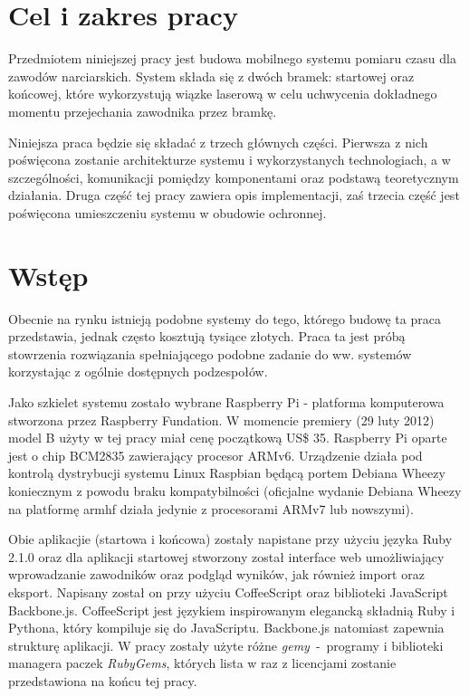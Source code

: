 \documentclass[11pt,a4paper, twoside]{article}
\begin{document}
 

\tableofcontents

\newpage
\cleardoublepage
\section{Cel i zakres pracy}
Przedmiotem niniejszej pracy jest budowa mobilnego systemu pomiaru czasu dla zawodów narciarskich. System składa się z dwóch bramek: startowej oraz końcowej, które wykorzystują wiązke laserową w celu uchwycenia dokładnego momentu przejechania zawodnika przez bramkę. 

Niniejsza praca będzie się składać z trzech głównych części. Pierwsza z nich poświęcona zostanie architekturze systemu i wykorzystanych technologiach, a w szczególności, komunikacji pomiędzy komponentami oraz podstawą teoretycznym działania. Druga część tej pracy zawiera opis implementacji, zaś trzecia część jest poświęcona umieszczeniu systemu w obudowie ochronnej.
\section{Wstęp}
Obecnie na rynku istnieją podobne systemy do tego, którego budowę ta praca przedstawia, jednak często kosztują tysiące złotych. Praca ta jest próbą stowrzenia rozwiązania spełniającego podobne zadanie do ww. systemów korzystając z ogólnie dostępnych podzespołów.

Jako szkielet systemu zostało wybrane Raspberry Pi - platforma komputerowa stworzona przez Raspberry Fundation. W momencie premiery (29 luty 2012) model B użyty w tej pracy miał cenę początkową US\$ 35. Raspberry Pi oparte jest o chip BCM2835 zawierający procesor ARMv6. Urządzenie działa pod kontrolą dystrybucji systemu Linux Raspbian będącą portem Debiana Wheezy koniecznym z powodu braku kompatybilności (oficjalne wydanie Debiana Wheezy na platformę armhf działa jedynie z procesorami ARMv7 lub nowszymi).

Obie aplikacjie (startowa i końcowa) zostały napistane przy użyciu języka Ruby 2.1.0 oraz dla aplikacji startowej stworzony został interface web umożliwiający wprowadzanie zawodników oraz podgląd wyników, jak również import oraz eksport. Napisany został on przy użyciu CoffeeScript oraz biblioteki JavaScript Backbone.js. 
CoffeeScript jest językiem inspirowanym elegancką składnią Ruby i Pythona, który kompiluje się do JavaScriptu. Backbone.js natomiast zapewnia strukturę aplikacji.
\newline
\newline
\noindent
W pracy zostały użyte różne \emph{gemy}~-~programy i biblioteki managera paczek \emph{RubyGems}, których lista w raz z licencjami zostanie przedstawiona na końcu tej pracy.
\newline
\end{document}
